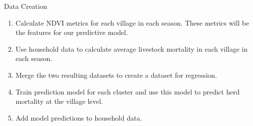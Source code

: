 \documentclass{beamer}
\begin{document}
\begin{frame}{Data Creation}
\begin{enumerate}
    \item Calculate NDVI metrics for each village in each season. These metrics will be the features for our predictive model. 
    \item Use household data to calculate average livestock mortality in each village in each season. 
    \item Merge the two resulting datasets to create a dataset for regression.
    \item Train prediction model for each cluster and use this model to predict herd mortality at the village level. 
    \item Add model predictions to household data. 
\end{enumerate}   
\end{frame}
\end{document}
